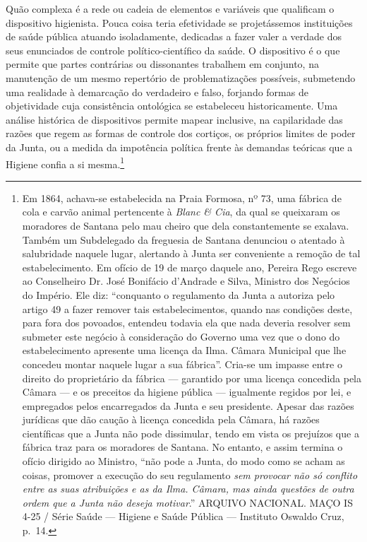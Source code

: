 Quão complexa é a rede ou cadeia de elementos e variáveis que qualificam
o dispositivo higienista. Pouca coisa teria efetividade se projetássemos
instituições de saúde pública atuando isoladamente, dedicadas a fazer
valer a verdade dos seus enunciados de controle político-científico da
saúde. O dispositivo é o que permite que partes contrárias ou
dissonantes trabalhem em conjunto, na manutenção de um mesmo repertório
de problematizações possíveis, submetendo uma realidade à demarcação do
verdadeiro e falso, forjando formas de objetividade cuja consistência
ontológica se estabeleceu historicamente. Uma análise histórica de
dispositivos permite mapear inclusive, na capilaridade das razões que
regem as formas de controle dos cortiços, os próprios limites de poder
da Junta, ou a medida da impotência política frente às demandas teóricas
que a Higiene confia a si mesma.\footnote{Em 1864, achava-se
  estabelecida na Praia Formosa, nº 73, uma fábrica de cola e carvão
  animal pertencente à \textit{Blanc \& Cia}, da qual se queixaram os
  moradores de Santana pelo mau cheiro que dela constantemente se
  exalava. Também um Subdelegado da freguesia de Santana denunciou o
  atentado à salubridade naquele lugar, alertando à Junta ser
  conveniente a remoção de tal estabelecimento. Em ofício de 19 de março
  daquele ano, Pereira Rego escreve ao Conselheiro Dr. José Bonifácio
  d'Andrade e Silva, Ministro dos Negócios do Império. Ele diz:
  ``conquanto o regulamento da Junta a autoriza pelo artigo 49 a fazer
  remover tais estabelecimentos, quando nas condições deste, para fora
  dos povoados, entendeu todavia ela que nada deveria resolver sem
  submeter este negócio à consideração do Governo uma vez que o dono do
  estabelecimento apresente uma licença da Ilma. Câmara Municipal que
  lhe concedeu montar naquele lugar a sua fábrica''. Cria-se um impasse
  entre o direito do proprietário da fábrica --- garantido por uma
  licença concedida pela Câmara --- e os preceitos da higiene pública ---
  igualmente regidos por lei, e empregados pelos encarregados da Junta e
  seu presidente. Apesar das razões jurídicas que dão caução à licença
  concedida pela Câmara, há razões científicas que a Junta não pode
  dissimular, tendo em vista os prejuízos que a fábrica traz para os
  moradores de Santana. No entanto, e assim termina o ofício dirigido ao
  Ministro, ``não pode a Junta, do modo como se acham as coisas,
  promover a execução do seu regulamento \textit{sem provocar não só
  conflito entre as suas atribuições e as da Ilma. Câmara, mas ainda
  questões de outra ordem que a Junta não deseja motivar}.'' ARQUIVO
  NACIONAL. MAÇO IS 4-25 / Série Saúde --- Higiene e Saúde Pública ---
  Instituto Oswaldo Cruz, p.~14.}

